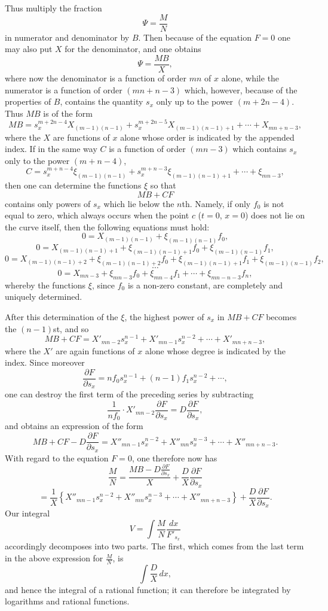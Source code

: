 \documentclass[10pt]{article}
\begin{document}
Thus multiply the fraction
\[
\Psi=\frac{M}{N}
\]
in numerator and denominator by $B$. Then because of the equation $F=0$ one may also put $X$ for the denominator, and one obtains
\[
\Psi=\frac{MB}{X},
\]
where now the denominator is a function of order $mn$ of $x$ alone, while the numerator is a function of order $(mn+n-3)$ which, however, because of the properties of $B$, contains the quantity $s_x$ only up to the power $(m+2n-4)$. Thus $MB$ is of the form
\[
MB=s_x^{m+2n-4}X_{(m-1)(n-1)}+s_x^{m+2n-5}X_{(m-1)(n-1)+1}+\cdots+X_{mn+n-3},
\]
where the $X$ are functions of $x$ alone whose order is indicated by the appended index. If in the same way $C$ is a function of order $(mn-3)$ which contains $s_x$ only to the power $(m+n-4)$,
\[
C=s_x^{m+n-4}\xi_{(m-1)(n-1)}+s_x^{m+n-3}\xi_{(m-1)(n-1)+1}+\cdots+\xi_{mn-3},
\]
then one can determine the functions $\xi$ so that
\[
MB+CF
\]
contains only powers of $s_x$ which lie below the $n$th. Namely, if only $f_0$ is not equal to zero, which always occurs when the point $c$ ($t=0$, $x=0$) does not lie on the curve itself, then the following equations must hold:
\[
0=X_{(m-1)(n-1)}+\xi_{(m-1)(n-1)}f_0,
\]
\[
0=X_{(m-1)(n-1)+1}+\xi_{(m-1)(n-1)+1}f_0+\xi_{(m-1)(n-1)}f_1,
\]
\[
0=X_{(m-1)(n-1)+2}+\xi_{(m-1)(n-1)+2}f_0+\xi_{(m-1)(n-1)+1}f_1+\xi_{(m-1)(n-1)}f_2,
\]
\[
\cdots
\]
\[
0=X_{mn-3}+\xi_{mn-3}f_0+\xi_{mn-4}f_1+\cdots+\xi_{mn-n-3}f_n,
\]
whereby the functions $\xi$, since $f_0$ is a non-zero constant, are completely and uniquely determined.

After this determination of the $\xi$, the highest power of $s_x$ in $MB+CF$ becomes the $(n-1)$st, and so
\[
MB+CF=X'_{mn-2}s_x^{n-1}+X'_{mn-1}s_x^{n-2}+\cdots+X'_{mn+n-3},
\]
where the $X'$ are again functions of $x$ alone whose degree is indicated by the index. Since moreover
\[
\frac{\partial F}{\partial s_x}=nf_0s_x^{n-1}+(n-1)f_1s_x^{n-2}+\cdots,
\]
one can destroy the first term of the preceding series by subtracting
\[
\frac{1}{nf_0}\cdot X'_{mn-2}\frac{\partial F}{\partial s_x}=D\frac{\partial F}{\partial s_x},
\]
and obtains an expression of the form
\[
MB+CF-D\frac{\partial F}{\partial s_x}=X''_{mn-1}s_x^{n-2}+X''_{mn}s_x^{n-3}+\cdots+X''_{mn+n-3}.
\]
With regard to the equation $F=0$, one therefore now has
\[
\frac{M}{N}=\frac{MB-D\frac{\partial F}{\partial s_x}}{X}+\frac{D}{X}\frac{\partial F}{\partial s_x}
\]
\[
=\frac{1}{X}\left\{X''_{mn-1}s_x^{n-2}+X''_{mn}s_x^{n-3}+\cdots+X''_{mn+n-3}\right\}+\frac{D}{X}\frac{\partial F}{\partial s_x}.
\]
Our integral
\[
V=\int\frac{M}{N}\frac{dx}{F'_{s_x}}
\]
accordingly decomposes into two parts. The first, which comes from the last term in the above expression for $\frac{M}{N}$, is
\[
\int\frac{D}{X}\,dx,
\]
and hence the integral of a rational function; it can therefore be integrated by logarithms and rational functions.
\end{document}
